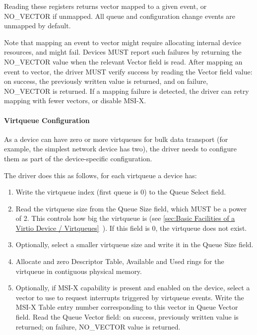 Reading these registers returns vector mapped to a given event,
or NO_VECTOR if unmapped. All queue and configuration change
events are unmapped by default.

Note that mapping an event to vector might require allocating
internal device resources, and might fail. Devices MUST report such
failures by returning the NO_VECTOR value when the relevant
Vector field is read. After mapping an event to vector, the
driver MUST verify success by reading the Vector field value: on
success, the previously written value is returned, and on
failure, NO_VECTOR is returned. If a mapping failure is detected,
the driver can retry mapping with fewer vectors, or disable MSI-X.

\paragraph{Virtqueue Configuration}\label{sec:Virtio Transport Options / Virtio Over PCI Bus / PCI-specific Initialization And Device Operation / Device Initialization / Virtqueue Configuration}

As a device can have zero or more virtqueues for bulk data
transport (for example, the simplest network device has two), the driver
needs to configure them as part of the device-specific
configuration.

The driver does this as follows, for each virtqueue a device has:

\begin{enumerate}
\item Write the virtqueue index (first queue is 0) to the Queue
  Select field.

\item Read the virtqueue size from the Queue Size field, which MUST
   be a power of 2. This controls how big the virtqueue is
  (see \ref{sec:Basic Facilities of a Virtio Device / Virtqueues}~). If this field is 0, the virtqueue does not exist.

\item Optionally, select a smaller virtqueue size and write it in the Queue Size
   field.

\item Allocate and zero Descriptor Table, Available and Used rings for the
   virtqueue in contiguous physical memory.

\item Optionally, if MSI-X capability is present and enabled on the
  device, select a vector to use to request interrupts triggered
  by virtqueue events. Write the MSI-X Table entry number
  corresponding to this vector in Queue Vector field. Read the
  Queue Vector field: on success, previously written value is
  returned; on failure, NO_VECTOR value is returned.
\end{enumerate}

